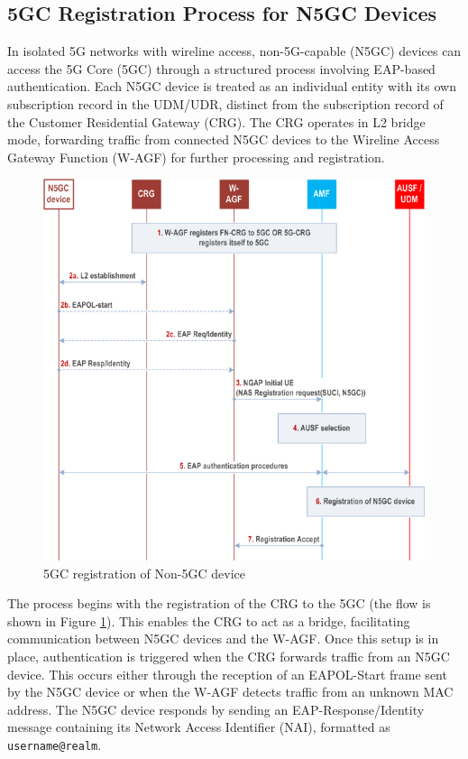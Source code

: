 \subsection{5GC Registration Process for N5GC Devices}

In isolated 5G networks with wireline access, non-5G-capable (N5GC) devices can access the 5G Core (5GC) through a structured process involving EAP-based authentication. Each N5GC device is treated as an individual entity with its own subscription record in the UDM/UDR, distinct from the subscription record of the Customer Residential Gateway (CRG). The CRG operates in L2 bridge mode, forwarding traffic from connected N5GC devices to the Wireline Access Gateway Function (W-AGF) for further processing and registration.

\begin{figure}
    \centering
    \includegraphics[width=0.75\linewidth]{figs/5GC registration of Non-5GC device.png}
    \caption{5GC registration of Non-5GC device}
    \label{fig:5GC registration of Non-5GC device}
\end{figure}

The process begins with the registration of the CRG to the 5GC (the flow is shown in Figure \ref{fig:5GC registration of Non-5GC device}). This enables the CRG to act as a bridge, facilitating communication between N5GC devices and the W-AGF. Once this setup is in place, authentication is triggered when the CRG forwards traffic from an N5GC device. This occurs either through the reception of an EAPOL-Start frame sent by the N5GC device or when the W-AGF detects traffic from an unknown MAC address. The N5GC device responds by sending an EAP-Response/Identity message containing its Network Access Identifier (NAI), formatted as \texttt{username@realm}.

